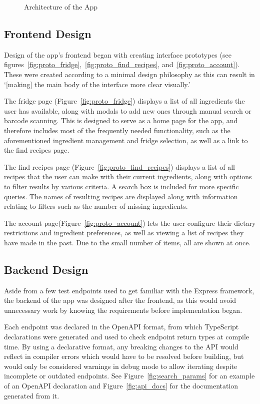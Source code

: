 \begin{figure}
    \centering
    
    \caption{\label{fig:architecture}Architecture of the App}
\end{figure}

\subsection{Frontend Design}
Design of the \chef{} app's frontend began with creating interface prototypes (see figures~\ref{fig:proto_fridge},~\ref{fig:proto_find_recipes},
and~\ref{fig:proto_account}). These were created according to a minimal design philosophy as this can result in \enquote*{[making] the main
body of the interface more clear visually.}~\cite{dong_minimalist_2019}

The fridge page (Figure~\ref{fig:proto_fridge}) displays a list of all ingredients the user has available, along with modals to add new ones
through manual search or barcode scanning. This is designed to serve as a home page for the app, and therefore includes most of the frequently
needed functionality, such as the aforementioned ingredient management and fridge selection, as well as a link to the find recipes page.

The find recipes page (Figure~\ref{fig:proto_find_recipes}) displays a list of all recipes that the user can make with their current ingredients,
along with options to filter results by various criteria. A search box is included for more specific queries. The names of resulting recipes are
displayed along with information relating to filters such as the number of missing ingredients.

The account page(Figure~\ref{fig:proto_account}) lets the user configure their dietary restrictions and ingredient preferences, as well as
viewing a list of recipes they have made in the past. Due to the small number of items, all are shown at once.

\subsection{Backend Design}

Aside from a few test endpoints used to get familiar with the Express framework, the backend of the \chef{} app was designed after the frontend,
as this would avoid unnecessary work by knowing the requirements before implementation began.

Each endpoint was declared in the OpenAPI format, from which TypeScript declarations were generated and used to check endpoint return types at compile time.
By using a declarative format, any breaking changes to the API would reflect in compiler errors which would have to be resolved before building, but would
only be considered warnings in debug mode to allow iterating despite incomplete or outdated endpoints. See Figure~\ref{fig:search_params} for an example of
an OpenAPI declaration and Figure~\ref{fig:api_docs} for the documentation generated from it.

